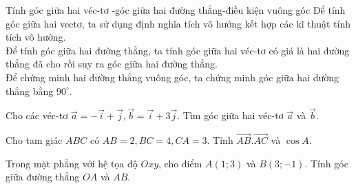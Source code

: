 \begin{dang}{Tính góc giữa hai véc-tơ -góc giữa hai đường thẳng-điều kiện vuông góc}
	Để tính góc giữa hai vectơ, ta sử dụng định nghĩa tích vô hướng kết hợp các kĩ thuật tính tích vô hướng.\\
	Để tính góc giữa hai đường thẳng, ta tính góc giữa hai véc-tơ có giá là hai đường thẳng đã cho rồi suy ra góc giữa hai đường thẳng.\\
	Để chứng minh hai đường thẳng vuông góc, ta chứng minh góc giữa hai đường thẳng bằng $90^\circ$.
\end{dang}
\begin{vd}%
	Cho các véc-tơ $\overrightarrow{a}=-\overrightarrow{i}+\overrightarrow{j}, \overrightarrow{b}=\overrightarrow{i}+3\overrightarrow{j}$. Tìm góc giữa hai véc-tơ $\overrightarrow{a}$ và $\overrightarrow{b}$.
\end{vd}

\begin{vd}%
	Cho tam giác $ABC$ có $AB=2, BC=4, CA=3$. Tính $\overrightarrow{AB}.\overrightarrow{AC}$ và $\cos A$.  
\end{vd}

\begin{vd}%
	Trong mặt phẳng với hệ tọa độ $Oxy$, cho điểm $A(1;3)$ và $B(3;-1)$. Tính góc giữa đường thẳng $OA$ và $AB$.
\end{vd}

